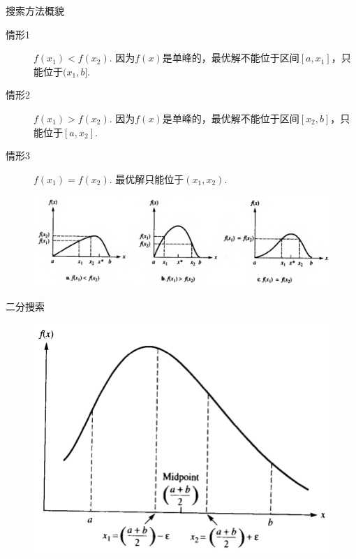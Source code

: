 \documentclass[UTF8]{ctexbeamer}
\begin{document}
\begin{frame}{搜索方法概貌}
  \begin{description}
  \item[情形1] $f(x_1) < f(x_2)$. 因为$f(x)$是单峰的，最优解不能位于区间$[a, x_1]$，只能位于$(x_1, b]$.
  \item[情形2] $f(x_1) > f(x_2)$. 因为$f(x)$是单峰的，最优解不能位于区间$[x_2, b]$，只能位于$[a, x_2]$.
  \item[情形3] $f(x_1) = f(x_2)$. 最优解只能位于$(x_1, x_2)$.
  \end{description}

  \begin{figure}
    \includegraphics[width=\textwidth{}]{search.png}
  \end{figure}  

\end{frame}

\begin{frame}{二分搜索}
  \begin{figure}
    \includegraphics[height=.8\textheight{}]{binary.png}
  \end{figure}    
\end{frame}
\end{document}
